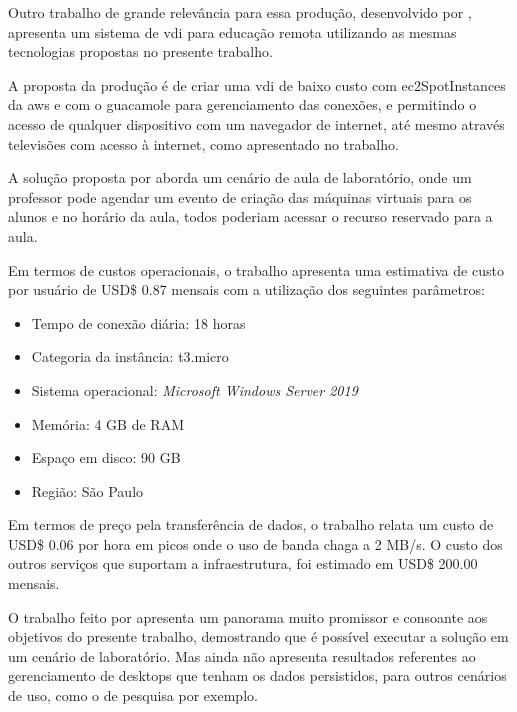 Outro trabalho de grande relevância para essa produção, desenvolvido por \citet{edufirestick},
apresenta um sistema de \gls{vdi} para educação remota utilizando as mesmas tecnologias propostas
no presente trabalho. 

A proposta da produção é de criar uma \gls{vdi} de baixo custo com \glspl{ec2SpotInstance} da
\gls{aws} e com o \gls{guacamole} para gerenciamento das conexões, e permitindo o acesso de
qualquer dispositivo com um navegador de internet, até mesmo através televisões com acesso à internet,
como apresentado no trabalho.

A solução proposta por \citet{edufirestick} aborda um cenário de aula de laboratório, onde um
professor pode agendar um evento de criação das máquinas virtuais para os alunos e no horário da
aula, todos poderiam acessar o recurso reservado para a aula.

Em termos de custos operacionais, o trabalho apresenta uma estimativa de custo por usuário de
USD\$ 0.87 mensais com a utilização dos seguintes parâmetros:

\begin{itemize}
    \item Tempo de conexão diária: 18 horas
    \item Categoria da instância: t3.micro
    \item Sistema operacional: \textit{Microsoft Windows Server 2019}
    \item Memória: 4 GB de RAM
    \item Espaço em disco: 90 GB
    \item Região: São Paulo
\end{itemize}

Em termos de preço pela transferência de dados, o trabalho relata um custo de USD\$ 0.06 por hora em
picos onde o uso de banda chaga a 2 MB/s. O custo dos outros serviços que suportam a infraestrutura,
foi estimado em USD\$ 200.00 mensais.

O trabalho feito por \citet{edufirestick} apresenta um panorama muito promissor e consoante aos
objetivos do presente trabalho, demostrando que é possível executar a solução em um cenário de
laboratório. Mas ainda não apresenta resultados referentes ao gerenciamento de \glspl{desktop} que
tenham os dados persistidos, para outros cenários de uso, como o de pesquisa por exemplo.